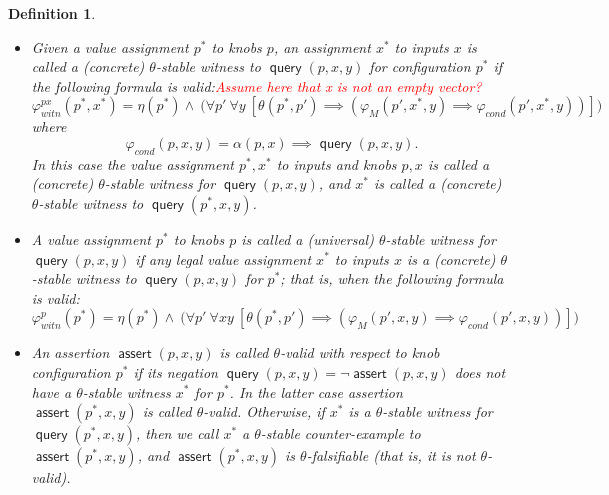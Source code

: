 \documentclass[a4paper,parskip=half]{article} %
\newcommand*\eqdef=
\newcommand*\query{\operatorname{\mathsf{query}}}
\newcommand*\assert{\operatorname{\mathsf{assert}}}
\newcommand\todozk[1]{\textcolor{red}{#1}}
\newtheorem{defn}[thm]{Definition}
\newcommand*\ZK{\todozk}
\begin{document}
\begin{defn}\label{def:stable:witness:validity}
\begin{itemize}
\item Given a value assignment $p^*$ to knobs $p$, an assignment $x^*$ to inputs $x$ is called a \emph{(concrete) $\theta$-stable witness} 
to $\query(p,x,y)$ for configuration $p^*$ if the following formula is valid:\ZK{Assume here that x is not an empty vector?}
\begin{equation}\label{form:gear:certify:knobs:inputs}
\varphi_{\mathit{witn}}^{px}(p^*,x^*) \eqdef
     \eta(p^*) \wedge ~\big(
    \forall p'~
    \forall y~[
   \theta(p^*, p') \implies (\varphi_M(p',x^*,y)  \implies  \varphi_{\mathit{cond}}(p',x^*,y))
    ]\big)
\end{equation}
where \[\varphi_{\mathit{cond}}(p,x,y) \eqdef \alpha(p,x) \implies \query(p,x,y).\]
In this case the value assignment $p^*, x^*$ to inputs and knobs $p,x$ is called a  \emph{(concrete) $\theta$-stable witness for $\query(p,x,y)$}, 
and $x^*$ is called a  \emph{(concrete) $\theta$-stable witness to $\query(p^*,x,y)$}.
\item A value assignment $p^*$ to knobs $p$ is called a  \emph{(universal) $\theta$-stable witness for $\query(p,x,y)$} if any legal value assignment 
$x^*$ to inputs $x$ is a (concrete) $\theta$-stable witness to $\query(p,x,y)$ for $p^*$; that is, when the following formula is valid:
\begin{equation}\label{form:gear:certify:knobs}
\varphi_{\mathit{witn}}^{p}(p^*) \eqdef
     \eta(p^*) \wedge ~\big(
    \forall p'~
    \forall xy~[
   \theta(p^*, p') \implies (\varphi_M(p',x,y)  \implies  \varphi_{\mathit{cond}}(p',x,y))
    ]\big)
\end{equation}
\item An assertion $\assert(p, x,y)$ is called \emph{$\theta$-valid with respect to knob configuration $p^*$} if its negation 
$\query(p, x,y) \eqdef \neg \assert(p, x,y)$ does not have a $\theta$-stable witness $x^*$ for $p^*$.  In the latter case  
assertion $\assert(p^*, x,y)$ is called \emph{$\theta$-valid}. Otherwise, if $x^*$ is a  $\theta$-stable witness for 
$\query(p^*, x,y)$, then we call $x^*$  a \emph{$\theta$-stable counter-example to  $\assert(p^*, x,y)$}, and 
$\assert(p^*, x,y)$ is \emph{$\theta$-falsifiable} (that is, it is not $\theta$-valid).
\end{itemize}
\end{defn}
\end{document}
